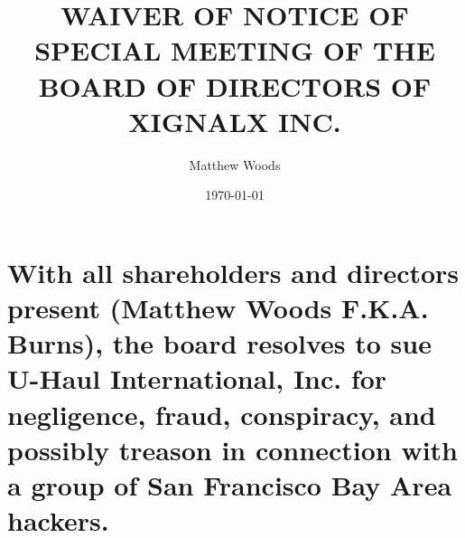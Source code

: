 \documentclass{article}
\title{WAIVER OF NOTICE OF SPECIAL MEETING OF THE BOARD OF DIRECTORS OF XIGNALX INC.}
\author{Matthew Woods}
\date{\today}
\begin{document}
\maketitle

\section{With all shareholders and directors present (Matthew Woods F.K.A. Burns), the board resolves to sue U-Haul International, Inc. for negligence, fraud, conspiracy, and possibly treason in connection with a group of San Francisco Bay Area hackers.}
\end{document}
